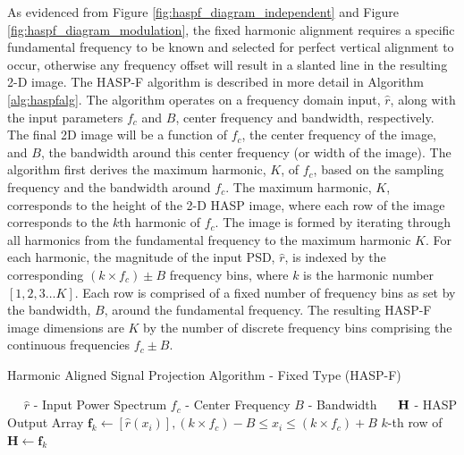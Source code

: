 As evidenced from Figure \ref{fig:haspf_diagram_independent} and Figure \ref{fig:haspf_diagram_modulation}, the fixed harmonic alignment requires a specific fundamental frequency to be known and selected for perfect vertical alignment to occur, otherwise any frequency offset will result in a slanted line in the resulting 2-D image.  The HASP-F algorithm is described in more detail in Algorithm \ref{alg:haspfalg}. The algorithm operates on a frequency domain input, $\hat{r}$, along with the input parameters $f_c$ and $B$, center frequency and bandwidth, respectively. The final 2D image will be a function of $f_c$, the center frequency of the image, and $B$, the bandwidth around this center frequency (or width of the image). The algorithm first derives the maximum harmonic, $K$, of $f_c$, based on the sampling frequency and the bandwidth around $f_c$.  The maximum harmonic, $K$, corresponds to the height of the 2-D HASP image, where each row of the image corresponds to the $k$th harmonic of $f_c$. The image is formed by iterating through all harmonics from the fundamental frequency to the maximum harmonic $K$.  For each harmonic, the magnitude of the input PSD, $\hat{r}$, is indexed by the corresponding $(k \times f_c) \pm B$ frequency bins, where $k$ is the harmonic number $\left[1,2,3 \ldots{} K \right]$.  Each row is comprised of a fixed number of frequency bins as set by the bandwidth, $B$, around the fundamental frequency.  The resulting HASP-F image dimensions are $K$ by the number of discrete frequency bins comprising the continuous frequencies $f_c \pm B$. 
 
\begin{algorithm}
	\caption{Harmonic Aligned Signal Projection Algorithm - Fixed Type (HASP-F)} \label{alg:haspfalg}
	\scriptsize
	\centering
	\begin{algorithmic}[1]
		\Require~~
		\Statex $\hat{r}$ - Input Power Spectrum
		\Statex $f_c$ - Center Frequency 
		\Statex $B$ - Bandwidth
		\Ensure~~
		\Statex $\bf{H}$ - HASP Output Array
		\Statex
		\State    $\mathbf{f}_k \gets \left[ \hat{r}(x_i) \right], (k \times f_c) - B \leq x_i \leq (k \times f_c) + B$
		\State		$k$-th row of $\mathbf{H} \gets \mathbf{f}_k$
		\EndFor
	\end{algorithmic}
\end{algorithm}

